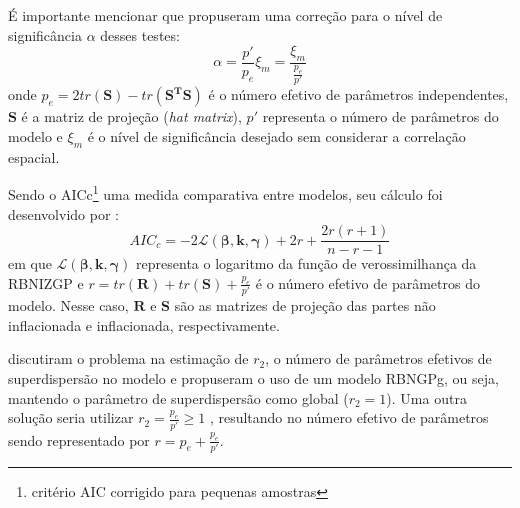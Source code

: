 \documentclass[12pt, a4paper, twoside]{report}
\numberwithin{equation}{section} %
\begin{document}
É importante mencionar que \cite{dasilva2016} propuseram uma correção para o nível de significância $\alpha$ desses testes:
\begin{equation}\label{ajuste_alpha_gwr}
\alpha=\frac{p'}{p_e}\xi_m=\frac{\xi_m}{\frac{p_e}{p'}}
\end{equation}
onde $p_e=2tr(\boldsymbol{S})-tr(\boldsymbol{S^TS})$ é o número efetivo de parâmetros independentes, $\boldsymbol{S}$ é a matriz de projeção (\textit{hat matrix}), $p'$ representa o número de parâmetros do modelo e $\xi_m$ é o nível de significância desejado sem considerar a correlação espacial.


Sendo o AICc\footnote{critério AIC corrigido para pequenas amostras} uma medida comparativa entre modelos, seu cálculo foi desenvolvido por \cite{hurvich1989}: %
\begin{equation}\label{aicc_gwr}
AIC_c=-2\mathcal{L}(\boldsymbol{\beta},\boldsymbol{k}, \boldsymbol{\gamma})+2r+\frac{2r(r+1)}{n-r-1}
\end{equation}
em que $\mathcal{L}(\boldsymbol{\beta},\boldsymbol{k}, \boldsymbol{\gamma})$ representa o logaritmo da função de verossimilhança da RBNIZGP e $r=tr(\boldsymbol{R})+tr(\boldsymbol{S})+\frac{p_e}{p'}$ é o número efetivo de parâmetros do modelo. Nesse caso, $\boldsymbol{R}$ e $\boldsymbol{S}$ são as matrizes de projeção das partes não inflacionada e inflacionada, respectivamente.

\cite{dasilva2014} discutiram o problema na estimação de $r_2$, o número de parâmetros efetivos de superdispersão no modelo e propuseram o uso de um modelo RBNGPg, ou seja, mantendo o parâmetro de superdispersão como global ($r_2=1$). Uma outra solução seria utilizar $r_2=\frac{p_e}{p'} \geq 1$ \citep{dasilva2016}, resultando no número efetivo de parâmetros sendo representado por $r=p_e+\frac{p_e}{p'}$.


\end{document}
